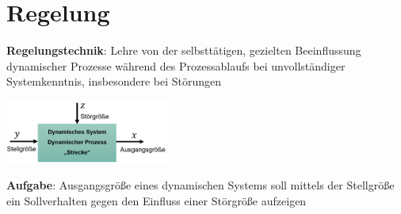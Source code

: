 \section{Regelung}

\textbf{Regelungstechnik}: Lehre von der selbsttätigen, gezielten Beeinflussung dynamischer Prozesse während des Prozessablaufs bei unvollständiger Systemkenntnis, insbesondere bei Störungen
\begin{center}
	\includegraphics[width=0.4\textwidth]{images/regelung.png}
\end{center}

\textbf{Aufgabe}: Ausgangsgröße eines dynamischen Systems soll mittels der Stellgröße ein
Sollverhalten gegen den Einfluss einer Störgröße aufzeigen



